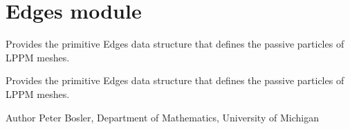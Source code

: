 \hypertarget{group___edges}{\section{Edges module}
\label{group___edges}
}


Provides the primitive Edges data structure that defines the passive particles of L\+P\+P\+M meshes.  


Provides the primitive Edges data structure that defines the passive particles of L\+P\+P\+M meshes. 

\begin{DoxyAuthor}{Author}
Peter Bosler, Department of Mathematics, University of Michigan 
\end{DoxyAuthor}
